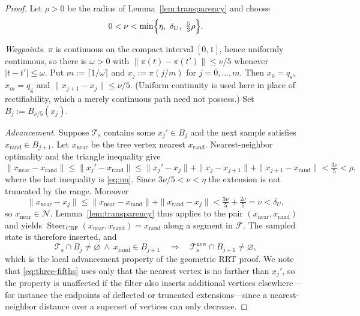 \documentclass[11pt]{article}
\theoremstyle{remark}
\newcommand{\F}{\mathcal{F}}
\newcommand{\Nb}{\mathcal{N}}
\newcommand{\Ts}{\mathcal{T}_{\mathrm{s}}}
\newcommand{\Steer}{\operatorname{Steer}_{\mathrm{CBF}}}
\begin{document}
\begin{proof}
Let $\rho>0$ be the radius of Lemma~\ref{lem:transparency} and choose
\begin{equation}
0<\nu<\min\Bigl\{\eta,\ \delta_U,\ \tfrac53\rho\Bigr\}.
\label{eq:nu}
\end{equation}

\emph{Waypoints.} $\pi$ is continuous on the compact interval $[0,1]$, hence uniformly
continuous, so there is $\omega>0$ with $\|\pi(t)-\pi(t')\|\le\nu/5$ whenever
$|t-t'|\le\omega$. Put $m:=\lceil1/\omega\rceil$ and $x_j:=\pi(j/m)$ for $j=0,\dots,m$.
Then $x_0=q_{\mathrm s}$, $x_m=q_{\mathrm g}$ and $\|x_{j+1}-x_j\|\le\nu/5$. (Uniform
continuity is used here in place of rectifiability, which a merely continuous path need not
possess.) Set $B_j:=B_{\nu/5}(x_j)$.

\emph{Advancement.} Suppose $\Ts$ contains some $x_j'\in B_j$ and the next sample satisfies
$x_{\mathrm{rand}}\in B_{j+1}$. Let $x_{\mathrm{near}}$ be the tree vertex nearest
$x_{\mathrm{rand}}$. Nearest-neighbor optimality and the triangle inequality give
\begin{equation}
\|x_{\mathrm{near}}-x_{\mathrm{rand}}\|
\le\|x_j'-x_{\mathrm{rand}}\|
\le\|x_j'-x_j\|+\|x_j-x_{j+1}\|+\|x_{j+1}-x_{\mathrm{rand}}\|
<\tfrac{3\nu}{5}<\rho,
\label{eq:three-fifths}
\end{equation}
where the last inequality is \eqref{eq:nu}. Since $3\nu/5<\nu<\eta$ the extension is not
truncated by the range. Moreover
\begin{equation}
\|x_{\mathrm{near}}-x_j\|
\le\|x_{\mathrm{near}}-x_{\mathrm{rand}}\|+\|x_{\mathrm{rand}}-x_j\|
<\tfrac{3\nu}{5}+\tfrac{2\nu}{5}=\nu<\delta_U,
\label{eq:near-in-tube}
\end{equation}
so $x_{\mathrm{near}}\in\Nb$. Lemma~\ref{lem:transparency} thus applies to the pair
$(x_{\mathrm{near}},x_{\mathrm{rand}})$ and yields
$\Steer(x_{\mathrm{near}},x_{\mathrm{rand}})=x_{\mathrm{rand}}$ along a segment in $\F$.
The sampled state is therefore inserted, and
\begin{equation}
\Ts\cap B_j\neq\varnothing\ \wedge\ x_{\mathrm{rand}}\in B_{j+1}
\quad\Longrightarrow\quad
\Ts^{\mathrm{new}}\cap B_{j+1}\neq\varnothing,
\label{eq:advance}
\end{equation}
which is the local advancement property of the geometric RRT proof. We note that
\eqref{eq:three-fifths} uses only that the nearest vertex is no farther than $x_j'$, so the
property is unaffected if the filter also inserts additional vertices elsewhere---for
instance the endpoints of deflected or truncated extensions---since a nearest-neighbor
distance over a superset of vertices can only decrease.


\end{proof}
\end{document}
